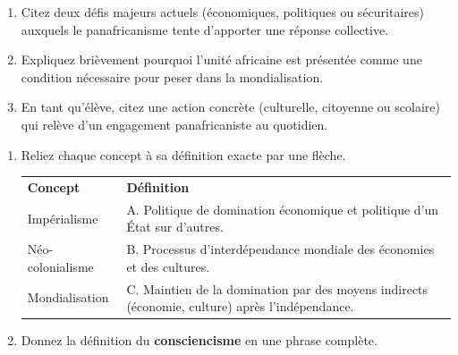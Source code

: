 \documentclass[11pt]{article}
\begin{document}
\begin{exercice}
\begin{enumerate}
    \item Citez deux défis majeurs actuels (économiques, politiques ou sécuritaires) auxquels le panafricanisme tente d'apporter une réponse collective.
    \item Expliquez brièvement pourquoi l'unité africaine est présentée comme une condition nécessaire pour peser dans la mondialisation.
    \item En tant qu'élève, citez une action concrète (culturelle, citoyenne ou scolaire) qui relève d'un engagement panafricaniste au quotidien.
\end{enumerate}
\end{exercice}

\begin{exercice}
\begin{enumerate}
    \item Reliez chaque concept à sa définition exacte par une flèche.
    \begin{tabular}{ll}
    \textbf{Concept} & \textbf{Définition} \\
    Impérialisme & A. Politique de domination économique et politique d'un État sur d'autres. \\
    Néo-colonialisme & B. Processus d'interdépendance mondiale des économies et des cultures. \\
    Mondialisation & C. Maintien de la domination par des moyens indirects (économie, culture) après l'indépendance. \\
    \end{tabular}
    \item Donnez la définition du \textbf{consciencisme} en une phrase complète.
\end{enumerate}
\end{exercice}
\end{document}
